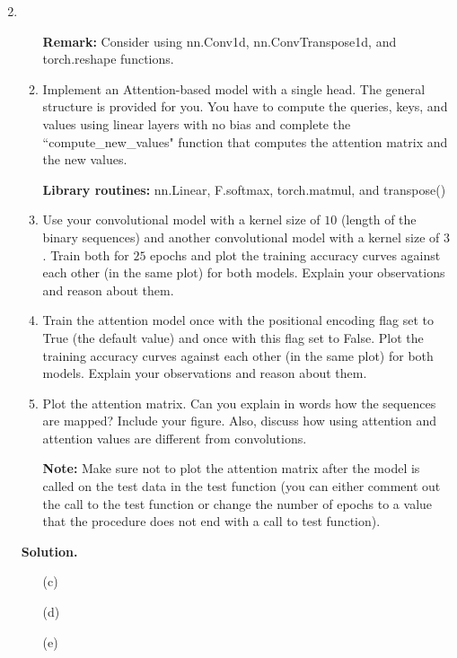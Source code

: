 \documentclass{article}
\theoremstyle{definition}
\theoremstyle{remark}
\newenvironment{Q}
{%
\clearpage
\item
}
{%
\phantom{s}%
\bigskip%
\noindent\textbf{Solution.}
}
\begin{document}
\begin{enumerate}[font={\Large\bfseries},left=0pt]
\begin{Q}
\begin{enumerate}
        \textbf{Remark:} Consider using nn.Conv1d, nn.ConvTranspose1d, and torch.reshape functions.

        \item Implement an Attention-based model with a single head. The general structure is provided for you. You have to compute the queries, keys, and values using linear layers with no bias and complete the ``compute\_new\_values" function that computes the attention matrix and the new values.
        
    \textbf{Library routines:}  nn.Linear, F.softmax, torch.matmul, and transpose()

        \item Use your convolutional model with a kernel size of $10$ (length of the binary sequences) and another convolutional model with a kernel size of $3$. Train both for $25$ epochs and plot the training accuracy curves against each other (in the same plot) for both models. Explain your observations and reason about them.
    

        \item Train the attention model once with the positional encoding flag set to True (the default value) and once with this flag set to False. Plot the training accuracy curves against each other (in the same plot) for both models. Explain your observations and reason about them.

        \item Plot the attention matrix. Can you explain in words how the sequences are mapped? Include your figure. Also, discuss how using attention and attention values are different from convolutions. 

        \textbf{Note:} Make sure not to plot the attention matrix after the model is called on the test data in the test function (you can either comment out the call to the test function or change the number of epochs to a value that the procedure does not end with a call to test function).
        
    \end{enumerate}
\end{Q}

\begin{enumerate}
  \item[(c)]
  \item[(d)]
  \item[(e)]
\end{enumerate}



 


\end{enumerate}
\end{document}

